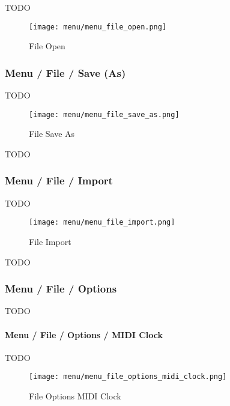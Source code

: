    TODO

\begin{figure}[H]
   \centering 
   \texttt{[image: menu/menu\_file\_open.png]}
   \caption{File Open}
   \label{fig:seq24_menu_file_open}
\end{figure}

\subsubsection{Menu / File / Save (As)}
\label{subsubsec:menu_file_open_save_as}

   TODO

\begin{figure}[H]
   \centering 
   \texttt{[image: menu/menu\_file\_save\_as.png]}
   \caption{File Save As}
   \label{fig:seq24_menu_file_save_as}
\end{figure}

   TODO

\subsubsection{Menu / File / Import}
\label{subsubsec:seq24_menu_file_import}

   TODO

\begin{figure}[H]
   \centering 
   \texttt{[image: menu/menu\_file\_import.png]}
   \caption{File Import}
   \label{fig:seq24_menu_file_import}
\end{figure}

   TODO

\subsubsection{Menu / File / Options}
\label{subsubsec:seq24_menu_file_options}

   TODO

\paragraph{Menu / File / Options / MIDI Clock}
\label{paragraph:seq24_menu_file_options_midi_clock}

   TODO

\begin{figure}[H]
   \centering 
   \texttt{[image: menu/menu\_file\_options\_midi\_clock.png]}
   \caption{File Options MIDI Clock}
   \label{fig:seq24_menu_file_options_midi_clock}
\end{figure}

